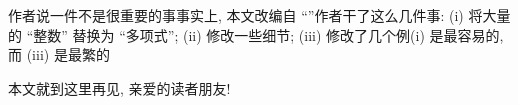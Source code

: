 \begin{remark}
    作者说一件不是很重要的事\period 事实上, 本文改编自 ``\SomePropertiesOfIntegers ''\period 作者干了这么几件事: (i) 将大量的 ``整数'' 替换为 ``多项式''; (ii) 修改一些细节; (iii) 修改了几个例\period (i) 是最容易的, 而 (iii) 是最繁的\period
\end{remark}

本文就到这里\period 再见, 亲爱的读者朋友!
